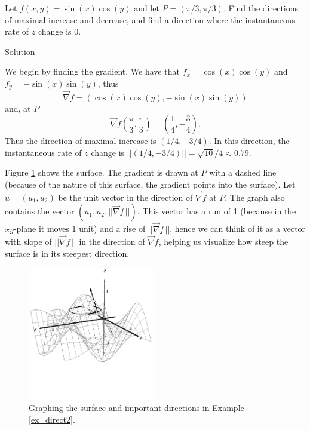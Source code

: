 \begin{example}\label{ex_direct2}
Let $f(x,y) = \sin(x)\cos(y)$ and let $P=(\pi/3,\pi/3)$. Find the directions of maximal increase and decrease, and find a direction where the instantaneous rate of $z$ change is 0.

Solution 

We begin by finding the gradient. We have that $f_x = \cos (x)\cos(y)$ and $f_y = -\sin(x)\sin(y)$, thus 
$$\vec{\nabla} f = \left( \cos(x)\cos(y),-\sin(x)\sin(y)\right)$$
and, at $P$
$$ \vec{\nabla} f\left(\frac{\pi}3,\frac{\pi}3\right) = \left(\frac14,-\frac34\right).$$
Thus the direction of maximal increase is $\left( 1/4, -3/4\right)$. In this direction, the instantaneous rate of $z$ change is $||\left( 1/4,-3/4\right)|| = \sqrt{10}/4 \approx 0.79.$ 

Figure \ref{fig_multi_var_14} shows the surface. The gradient is drawn at $P$ with a dashed line (because of the nature of this surface, the gradient points into the surface). Let $\hat u = \left( u_1, u_2\right) $ be the unit vector in the direction of $\vec{\nabla} f$ at $P$. The graph also contains the vector $\left( u_1, u_2, ||\vec{\nabla} f\,||\right)$. This vector has a run of 1 (because in the $xy$-plane it moves 1 unit) and a rise of $||\vec{\nabla} f\,||$, hence we can think of it as a vector with slope of $||\vec{\nabla} f\,||$ in the direction of $\vec{\nabla} f$, helping us visualize how steep the surface is in its steepest direction. 


\begin{figure}[H]
	\begin{center}
			\includegraphics[width=0.5\textwidth]{fig_multi_var_14}
	\caption{Graphing the surface and important directions in Example \ref{ex_direct2}.}
	\label{fig_multi_var_14}
	\end{center}
\end{figure}




\end{example}
